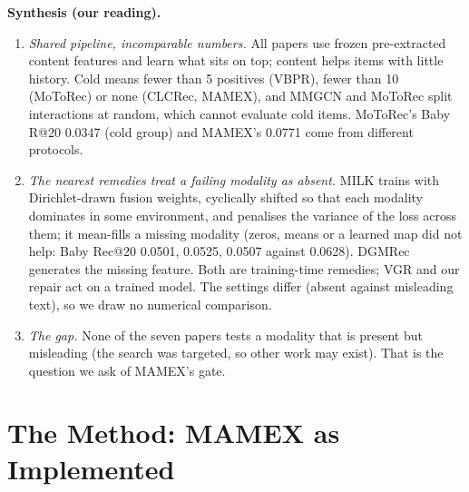 \documentclass[conference]{IEEEtran}
\begin{document}
\textbf{Synthesis (our reading).}
\begin{enumerate}
\item \emph{Shared pipeline, incomparable numbers.} All papers use frozen pre-extracted content features and learn what sits on top; content helps items with little history. Cold means fewer than 5 positives (VBPR), fewer than 10 (MoToRec) or none (CLCRec, MAMEX), and MMGCN and MoToRec split interactions at random, which cannot evaluate cold items. MoToRec's Baby R@20 0.0347 (cold group) and MAMEX's 0.0771 come from different protocols.
\item \emph{The nearest remedies treat a failing modality as absent.} MILK trains with Dirichlet-drawn fusion weights, cyclically shifted so that each modality dominates in some environment, and penalises the variance of the loss across them; it mean-fills a missing modality (zeros, means or a learned map did not help: Baby Rec@20 0.0501, 0.0525, 0.0507 against 0.0628). DGMRec generates the missing feature. Both are training-time remedies; VGR and our repair act on a trained model. The settings differ (absent against misleading text), so we draw no numerical comparison.
\item \emph{The gap.} None of the seven papers tests a modality that is present but misleading (the search was targeted, so other work may exist). That is the question we ask of MAMEX's gate.
\end{enumerate}

\section{The Method: MAMEX as Implemented}
\end{document}
